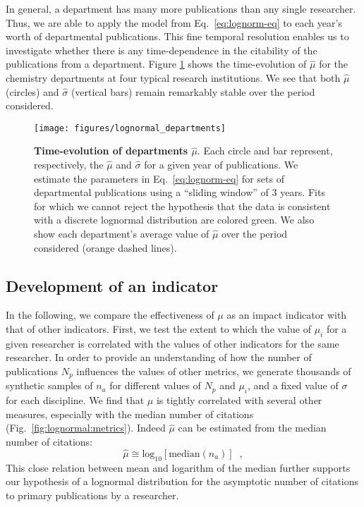 In general, a department has many more publications than any single researcher. Thus, we are able to apply the model from Eq.~\eqref{eq:lognorm-eq} to each year's worth of departmental publications. This fine temporal resolution enables us to investigate whether there is any time-dependence in the citability of the publications from a department. Figure \ref{fig:lognormal:departments} shows the time-evolution of $\hat{\mu}$ for the chemistry departments at four typical research institutions. We see that both $\hat{\mu}$ (circles) and $\hat{\sigma}$ (vertical bars) remain remarkably stable over the period considered.

\begin{figure}[t]
\texttt{[image: figures/lognormal\_departments]}
\caption[Time-evolution of departments $\hat{\mu}$.]{\textbf{Time-evolution of departments $\hat{\mu}$}. Each circle and bar represent, respectively, the $\hat{\mu}$ and $\hat{\sigma}$ for a given year of publications. We estimate the parameters in Eq.~\eqref{eq:lognorm-eq} for sets of departmental publications using a ``sliding window'' of 3 years. Fits for which we cannot reject the hypothesis that the data is consistent with a discrete lognormal distribution are colored green. We also show each department's average value of $\hat{\mu}$ over the period considered (orange dashed lines).}
\label{fig:lognormal:departments}
\end{figure}


\subsection{Development of an indicator}

In the following, we compare the effectiveness of $\mu$ as an impact indicator with that of other indicators. First, we test the extent to which the value of $\mu_i$ for a given researcher is correlated with the values of other indicators for the same researcher. In order to provide an understanding of how the number of publications $N_p$ influences the values of other metrics, we generate thousands of synthetic samples of $n_a$ for different values of $N_p$ and $\mu_i$, and a fixed value of $\sigma$ for each discipline. We find that $\mu$ is tightly correlated with several other measures, especially with the median number of citations (Fig.~\ref{fig:lognormal:metrics}). Indeed $\hat{\mu}$ can be estimated from the median number of citations:
\begin{equation} \label{eq:mu-med}
\hat{\mu} \cong \textrm{log}_{10} [\textrm{median}(n_a)]\;\;,
\end{equation}
This close relation between mean and logarithm of the median further supports our hypothesis of a lognormal distribution for the asymptotic number of citations to primary publications by a researcher.

